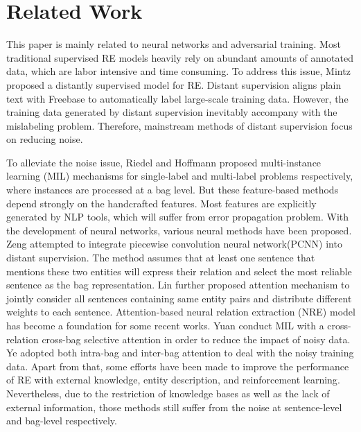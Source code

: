 \documentclass[conference]{IEEEtran}
\begin{document}
\section{Related Work}
This paper is mainly related to neural networks and adversarial training.
Most traditional supervised RE models \cite{socher2012semantic, zeng2014relation, santos2015classifying} heavily rely on abundant amounts of annotated data, which are labor intensive and time consuming.
To address this issue, Mintz\cite{mintz2009distant} proposed a distantly supervised model for RE.
Distant supervision aligns plain text with Freebase to automatically label large-scale training data.
However, the training data generated by distant supervision inevitably accompany with the mislabeling problem.
Therefore, mainstream methods of distant supervision focus on reducing noise.

To alleviate the noise issue, Riedel\cite{riedel2010modeling} and Hoffmann\cite{hoffmann2011knowledge} proposed multi-instance learning (MIL) mechanisms for single-label and multi-label problems respectively, where instances are processed at a bag level.
But these feature-based methods depend strongly on the handcrafted features.
Most features are explicitly generated by NLP tools, which will suffer from error propagation problem.
With the development of neural networks, various neural methods have been proposed.
Zeng\cite{zeng2015distant} attempted to integrate piecewise convolution neural network(PCNN) into distant supervision.
The method assumes that at least one sentence that mentions these two entities will express their relation and select the most reliable sentence as the bag representation.
Lin\cite{lin2016neural} further proposed attention mechanism to jointly consider all sentences containing same entity pairs and distribute different weights to each sentence.
Attention-based neural relation extraction (NRE) model has become a foundation for some recent works\cite{liu2017soft, ZHOU2018240}.
Yuan\cite{yuan2018crossrelation} conduct MIL with a cross-relation cross-bag selective attention in order to reduce the impact of noisy data.
Ye\cite{ye-ling-2019-distant} adopted both intra-bag and inter-bag attention to deal with the noisy training data.
Apart from that, some efforts have been made to improve the performance of RE with external knowledge, entity description, and reinforcement learning\cite{han2018neural, ji2017, feng2018reinforcement}.
Nevertheless, due to the restriction of knowledge bases as well as the lack of external information, those methods still suffer from the noise at sentence-level and bag-level respectively.
\end{document}
